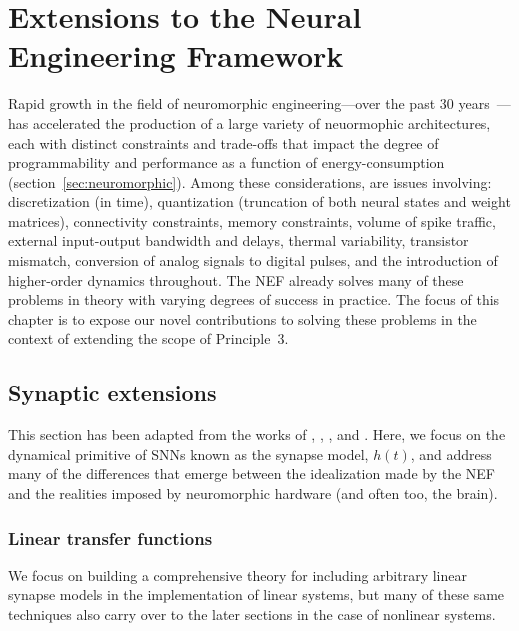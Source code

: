\chapter{Extensions to the Neural Engineering Framework}
\label{chapt:nef-extensions}

Rapid growth in the field of neuromorphic engineering---over the past 30 years~\citep{mead1988silicon}---has accelerated the production of a large variety of neuormophic architectures, each with distinct constraints and trade-offs that impact the degree of programmability and performance as a function of energy-consumption (section~\ref{sec:neuromorphic}).
Among these considerations, are issues involving:
discretization (in time), quantization (truncation of both neural states and weight matrices), connectivity constraints, memory constraints, volume of spike traffic, external input-output bandwidth and delays, thermal variability, transistor mismatch, conversion of analog signals to digital pulses, and the introduction of higher-order dynamics throughout.
The NEF already solves many of these problems in theory with varying degrees of success in practice.
The focus of this chapter is to expose our novel contributions to solving these problems in the context of extending the scope of Principle~3.

\section{Synaptic extensions}
\label{sec:synaptic-extensions}

This section has been adapted from the works of \citet[][patent pending]{dynamicspatent}, \citet{voelker2017iscas}, \citet{voelker2017neuromorphic}, and \citet{voelker2018}.
Here, we focus on the dynamical primitive of SNNs known as the synapse model, $h(t)$, and address many of the differences that emerge between the idealization made by the NEF and the realities imposed by neuromorphic hardware (and often too, the brain).

\subsection{Linear transfer functions}
\label{sec:linear-extensions}

We focus on building a comprehensive theory for including arbitrary linear synapse models in the implementation of linear systems, but many of these same techniques also carry over to the later sections in the case of nonlinear systems. %

